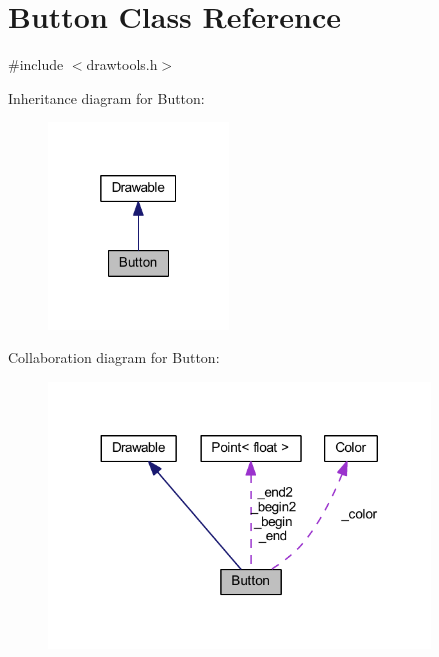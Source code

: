\hypertarget{class_button}{}\section{Button Class Reference}
\label{class_button}


{\ttfamily \#include $<$drawtools.\+h$>$}



Inheritance diagram for Button\+:
\nopagebreak
\begin{figure}[H]
\begin{center}
\leavevmode
\includegraphics[width=136pt]{class_button__inherit__graph}
\end{center}
\end{figure}


Collaboration diagram for Button\+:
\nopagebreak
\begin{figure}[H]
\begin{center}
\leavevmode
\includegraphics[width=287pt]{class_button__coll__graph}
\end{center}
\end{figure}
